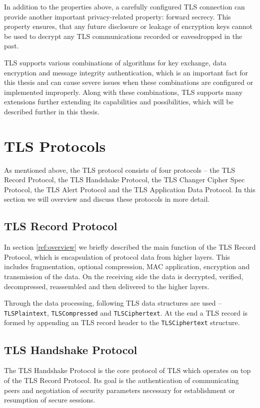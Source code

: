     In addition to the properties above, a carefully configured TLS connection
    can provide another important privacy-related property: forward secrecy.
    This property ensures, that any future disclosure or leakage of encryption
    keys cannot be used to decrypt any TLS communications recorded or
    eavesdropped in the past.

    TLS supports various combinations of algorithms for key exchange, data
    encryption and message integrity authentication, which is an important fact
    for this thesis and can cause severe issues when these combinations
    are configured or implemented improperly. Along with these combinations,
    TLS supports many extensions further extending its capabilities and possibilities,
    which will be described further in this thesis.

\section{TLS Protocols}
    As mentioned above, the TLS protocol consists of four protocols --
    the TLS Record Protocol, the TLS Handshake Protocol, the TLS Changer Cipher
    Spec Protocol, the TLS Alert Protocol and the TLS Application Data Protocol.
    In this section we will overview and discuss these protocols in more detail.

\subsection{TLS Record Protocol}
    In section \ref{ref:overview} we briefly described the main function of the
    TLS Record Protocol, which is encapsulation of protocol data from higher
    layers. This includes fragmentation, optional compression, MAC application,
    encryption and transmission of the data. On the receiving side the data is
    decrypted, verified, decompressed, reassembled and then delivered to the
    higher layers.

    Through the data processing, following TLS data structures are used --
    \texttt{TLSPlaintext}, \texttt{TLSCompressed} and \texttt{TLSCiphertext}.
    At the end a TLS record is formed by appending an TLS record header to
    the \texttt{TLSCiphertext} structure.

\subsection{TLS Handshake Protocol} \label{ref:tls_handshake_protocol}
    The TLS Handshake Protocol is the core protocol of TLS which operates on
    top of the TLS Record Protocol. Its goal is the authentication of communicating
    peers and negotiation of security parameters necessary for establishment or
    resumption of secure sessions.

